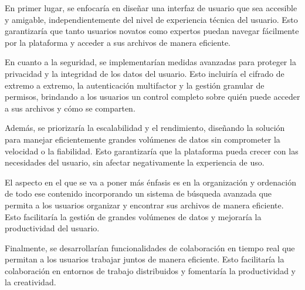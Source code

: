 En primer lugar, se enfocaría en diseñar una interfaz de usuario que sea accesible y amigable, independientemente del nivel de experiencia técnica del usuario. Esto garantizaría que tanto usuarios novatos como expertos puedan navegar fácilmente por la plataforma y acceder a sus archivos de manera eficiente.

En cuanto a la seguridad, se implementarían medidas avanzadas para proteger la privacidad y la integridad de los datos del usuario. Esto incluiría el cifrado de extremo a extremo, la autenticación multifactor y la gestión granular de permisos, brindando a los usuarios un control completo sobre quién puede acceder a sus archivos y cómo se comparten.

Además, se priorizaría la escalabilidad y el rendimiento, diseñando la solución para manejar eficientemente grandes volúmenes de datos sin comprometer la velocidad o la fiabilidad. Esto garantizaría que la plataforma pueda crecer con las necesidades del usuario, sin afectar negativamente la experiencia de uso.

El aspecto en el que se va a poner más énfasis es en la organización y ordenación de todo ese contenido incorporando un sistema de búsqueda avanzada que permita a los usuarios organizar y encontrar sus archivos de manera eficiente. Esto facilitaría la gestión de grandes volúmenes de datos y mejoraría la productividad del usuario.

Finalmente, se desarrollarían funcionalidades de colaboración en tiempo real que permitan a los usuarios trabajar juntos de manera eficiente. Esto facilitaría la colaboración en entornos de trabajo distribuidos y fomentaría la productividad y la creatividad.